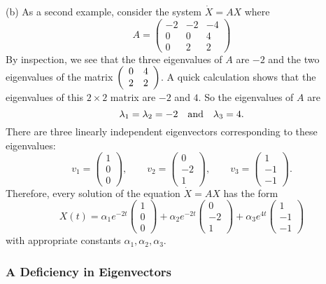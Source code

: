 \documentclass{ximera}
\begin{document}
\noindent (b) As a second example, consider the system $\dot{X} = AX$ where
\begin{equation*} \label{eq:exsyslin1}
A = 
\left(\begin{array}{rrr}
-2 & -2 & -4 \\
 0 & 0 & 4 \\
 0 & 2 & 2
\end{array}\right)
\end{equation*}
By inspection, we see that the three eigenvalues of $A$ are $-2$ and the two
eigenvalues of the matrix $\left(\begin{array}{rr} 0 & 4\\ 2 &2\end{array}\right)$.  A quick calculation shows
that the eigenvalues of this $2\times 2$ matrix are $-2$ and $4$.  So the 
eigenvalues of $A$ are
\[
\lambda_1=\lambda_2=-2 \quad\mbox{and}\quad \lambda_3=4.
\]
There are three linearly independent eigenvectors corresponding to these 
eigenvalues: 
\[
v_1=\left(\begin{array}{r}
1 \\ 0 \\ 0
\end{array}\right),\qquad
v_2=\left(\begin{array}{r}
0 \\ -2 \\ 1
\end{array}\right),\qquad
v_3=\left(\begin{array}{r}
1 \\ -1 \\ -1
\end{array}\right).
\]
Therefore, every solution of the equation $\dot X=AX$ has the form
\[
X(t)=\alpha_1e^{-2t}\left(\begin{array}{r}
1 \\ 0 \\ 0
\end{array}\right) + \alpha_2e^{-2t}\left(\begin{array}{r}
0 \\ -2 \\ 1\end{array}\right) + \alpha_3e^{4t}\left(\begin{array}{r}
1 \\ -1 \\ -1
\end{array}\right)
\] 
with appropriate constants $\alpha_1,\alpha_2,\alpha_3$.


\subsubsection*{A Deficiency in Eigenvectors}
\end{document}
